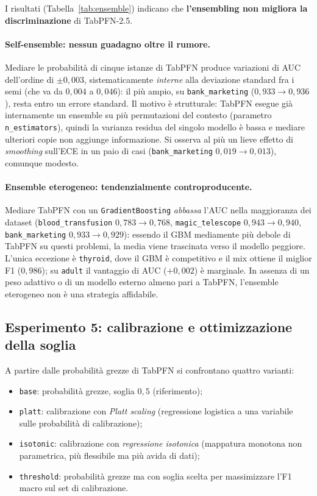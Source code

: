 I risultati (Tabella~\ref{tab:ensemble}) indicano che \textbf{l'ensembling non
migliora la discriminazione} di TabPFN-2.5.

\paragraph{Self-ensemble: nessun guadagno oltre il rumore.} Mediare le
probabilità di cinque istanze di TabPFN produce variazioni di AUC dell'ordine di
$\pm 0{,}003$, sistematicamente \emph{interne} alla deviazione standard fra i
semi (che va da $0{,}004$ a $0{,}046$): il più ampio, su \texttt{bank\_marketing}
($0{,}933 \to 0{,}936$), resta entro un errore standard. Il motivo è strutturale:
TabPFN esegue già internamente un ensemble su più permutazioni del contesto
(parametro \texttt{n\_estimators}), quindi la varianza residua del singolo
modello è bassa e mediare ulteriori copie non aggiunge informazione. Si osserva
al più un lieve effetto di \emph{smoothing} sull'ECE in un paio di casi
(\texttt{bank\_marketing} $0{,}019 \to 0{,}013$), comunque modesto.

\paragraph{Ensemble eterogeneo: tendenzialmente controproducente.} Mediare
TabPFN con un \texttt{GradientBoosting} \emph{abbassa} l'AUC nella maggioranza
dei dataset (\texttt{blood\_transfusion} $0{,}783 \to 0{,}768$,
\texttt{magic\_telescope} $0{,}943 \to 0{,}940$, \texttt{bank\_marketing}
$0{,}933 \to 0{,}929$): essendo il GBM mediamente più debole di TabPFN su questi
problemi, la media viene trascinata verso il modello peggiore. L'unica eccezione
è \texttt{thyroid}, dove il GBM è competitivo e il mix ottiene il miglior F1
($0{,}986$); su \texttt{adult} il vantaggio di AUC ($+0{,}002$) è marginale.
In assenza di un peso adattivo o di un modello esterno almeno pari a TabPFN,
l'ensemble eterogeneo non è una strategia affidabile.

\subsection{Esperimento 5: calibrazione e ottimizzazione della soglia}
\label{sec:exp-calib}
A partire dalle probabilità grezze di TabPFN si confrontano quattro varianti:
\begin{itemize}[nosep]
  \item \texttt{base}: probabilità grezze, soglia $0{,}5$ (riferimento);
  \item \texttt{platt}: calibrazione con \emph{Platt scaling} (regressione
  logistica a una variabile sulle probabilità di calibrazione);
  \item \texttt{isotonic}: calibrazione con \emph{regressione isotonica}
  (mappatura monotona non parametrica, più flessibile ma più avida di dati);
  \item \texttt{threshold}: probabilità grezze ma con soglia scelta per
  massimizzare l'F1 macro sul set di calibrazione.
\end{itemize}


